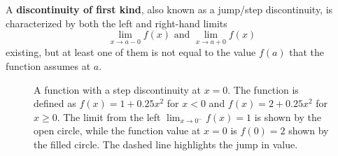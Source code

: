   \begin{definition}
    A \textbf{discontinuity of first kind}, also known as a jump/step discontinuity, is characterized by both the left and right-hand limits 
    \begin{equation}
      \lim_{x \rightarrow a-0} f(x) \text{ and } \lim_{x \rightarrow a+0} f(x)
    \end{equation}
    existing, but at least one of them is not equal to the value $f(a)$ that the function assumes at $a$. 

    \begin{figure}[H]
      \centering 
      \caption{A function with a step discontinuity at $x=0$. The function is defined as $f(x) = 1 + 0.25x^2$ for $x < 0$ and $f(x) = 2 + 0.25x^2$ for $x \geq 0$. The limit from the left $\lim_{x \to 0^-} f(x) = 1$ is shown by the open circle, while the function value at $x=0$ is $f(0) = 2$ shown by the filled circle. The dashed line highlights the jump in value.}
      \label{fig:step-discontinuity}
    \end{figure}
  \end{definition}

